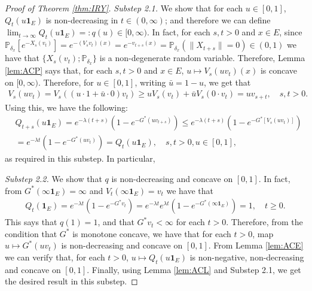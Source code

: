 \documentclass[12pt,a4paper]{amsart}
\numberwithin{equation}{section}
\theoremstyle{plain}
\theoremstyle{definition}
\begin{document}
\begin{proof}[Proof of Theorem \ref{thm:IRY}]
\emph{Substep 2.1.} We show that for each $u \in [0,1]$, $Q_t(u \mathbf 1_E)$ is non-decreasing in $t\in (0,\infty)$; and therefore we can define $\lim_{t\to \infty} Q_t(u \mathbf 1_E)=:q(u)\in [0,\infty)$.
In fact, for each $s,t> 0$ and $x\in E$, since $\mathbb P_{\delta_x} [e^{-X_s (v_t)}] = e^{- (V_s v_t) (x)} = e^{-v_{t+s}(x)} = \mathbb P_{\delta_x}(\|X_{t+s}\| = 0) \in (0, 1)$ we have that $\{X_s(v_t); \mathbb P_{\delta_x}\}$ is a non-degenerate random variable.
Therefore, Lemma \ref{lem:ACP} says that, for each $s,t > 0$ and $x\in E$, $u\mapsto V_s(uv_t)(x)$ is concave on $[0,\infty)$. 
Therefore, for $u\in [0,1]$, writing $\bar u = 1- u$, we get that
\begin{align}
	V_s(uv_t)
  =V_s((u\cdot 1 + \bar u \cdot 0)v_t) 
  \geq uV_s(v_t) + \bar u V_s(0\cdot v_t) 
  = uv_{s+t},
  \quad s,t > 0.
\end{align} 
Using this, we have the following: 
\begin{align}
  & Q_{t+s}(u\mathbf 1_E) 
    = e^{- \lambda (t+s)} ( 1-e^{-G^*(uv_{t+s})} ) 
  \leq e^{- \lambda(t+s)}( 1-e^{-G^*[V_s(uv_t)]} ) \\
  & = e^{-\lambda t}( 1-e^{-G^*(uv_t)} )
    = Q_t(u\mathbf 1_E)
  , \quad s,t > 0, u \in [0,1],
\end{align}
as required in this substep.
In particular, 

\emph{Substep 2.2.}
We show that $q$ is non-decreasing and concave on $[0,1]$.
In fact, from $G^*(\infty \mathbf 1_E) = \infty$ and $V_t(\infty \mathbf 1_E) = v_t$ we have that
\begin{align}
	Q_t(\mathbf 1_E) = e^{- \lambda t} ( 1-e^{-G^*v_t} )
  = e^{- \lambda t} e^{\lambda t}( 1-e^{-G^*(\infty\mathbf 1_E)} )
  = 1,
  \quad t\geq 0.
\end{align}
This says that $q(1) = 1$, and that $G^*v_t < \infty$ for each $t>0$. 
Therefore, from the condition that $G^*$ is monotone concave, we have that for each $t>0$, map $u \mapsto G^*(uv_t)$ is non-decreasing and concave on $[0,1]$.
From Lemma \ref{lem:ACE} we can verify that, for each $t> 0$, $u \mapsto Q_t(u \mathbf 1_E)$ is non-negative, non-decreasing and concave on $[0,1]$.
Finally, using Lemma \ref{lem:ACL} and Substep 2.1, we get the desired result in this substep. 


\end{proof}
\end{document}
